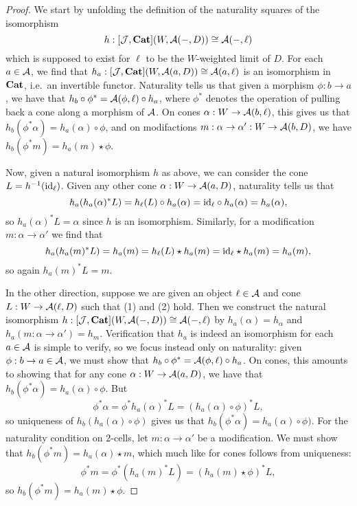 \documentclass[../thesis.tex]{subfiles}
\begin{document}
\begin{proof}
  We start by unfolding the definition of the naturality squares of the isomorphism
  \[h : [{\mathcal{J}},{\mathbf{Cat}}](W,{\mathcal{A}}(-,D)) \cong {\mathcal{A}}(-,\ell)\]
  which is supposed to exist for $\ell$ to be the $W$-weighted limit of $D$. For each $a \in {\mathcal{A}}$, we find that
  $h_a : [{\mathcal{J}},{\mathbf{Cat}}](W,{\mathcal{A}}(a,D)) \cong {\mathcal{A}}(a,\ell)$ is an isomorphism in ${\mathbf{Cat}}$, i.e.\ an invertible functor.
  Naturality tells us that given a morphism $\phi : b \to a$, we have that $h_b \circ \phi^* = {\mathcal{A}}(\phi,\ell)
  \circ h_a$, where $\phi^*$ denotes the operation of pulling back a cone along a morphism of ${\mathcal{A}}$. On cones
  $\alpha : W \to {\mathcal{A}}(b,\ell)$, this gives us that $h_b(\phi^*\alpha) = h_a(\alpha) \circ \phi$, and on
  modifactions $m : \alpha \to \alpha' : W \to {\mathcal{A}}(b,D)$, we have $h_b(\phi^*m) = h_a(m) \star \phi$.

  Now, given a natural isomorphism $h$ as above, we can consider the cone $L = h^{-1}({\mathrm{id}}_\ell)$. Given any
  other cone $\alpha : W \to {\mathcal{A}}(a,D)$, naturality tells us that
  \[h_a(h_a(\alpha)^*L) = h_\ell(L) \circ h_a(\alpha) = {\mathrm{id}}_\ell \circ h_a(\alpha) = h_a(\alpha),\]
  so $h_a(\alpha)^*L = \alpha$ since $h$ is an isomorphism. Similarly, for a modification $m : \alpha \to
  \alpha'$ we find that
  \[h_a(h_a(m)^*L) = h_a(m) = h_\ell(L) \star h_a(m) = {\mathrm{id}}_\ell \star h_a(m) = h_a(m),\]
  so again $h_a(m)^*L = m$.


  In the other direction, suppose we are given an object $\ell \in {\mathcal{A}}$ and cone $L : W \to {\mathcal{A}}(\ell,D)$
  such that (1) and (2) hold. Then we construct the natural isomorphism $h : [{\mathcal{J}},{\mathbf{Cat}}](W,{\mathcal{A}}(-,D)) \cong
  {\mathcal{A}}(-,\ell)$ by $h_a(\alpha) = h_\alpha$ and $h_a(m : \alpha \to \alpha') = h_m$. Verification that $h_a$
  is indeed an isomorphism for each $a \in {\mathcal{A}}$ is simple to verify, so we focus instead only on naturality:
  given $\phi : b \to a \in {\mathcal{A}}$, we must show that $h_b \circ \phi^* = {\mathcal{A}}(\phi,\ell) \circ h_a$. On cones,
  this amounts to showing that for any cone $\alpha : W \to {\mathcal{A}}(a,D)$, we have that $h_b(\phi^*\alpha) =
  h_a(\alpha) \circ \phi$. But
  \[
    \phi^*\alpha = \phi^*h_a(\alpha)^*L = (h_a(\alpha) \circ \phi)^*L,
  \]
  so uniqueness of $h_b(h_a(\alpha) \circ \phi)$ gives us that $h_b(\phi^*\alpha) = h_a(\alpha) \circ \phi)$.
  For the naturality condition on 2-cells, let $m : \alpha \to \alpha'$ be a modification. We must show that
  $h_b(\phi^*m) = h_a(\alpha) \star m$, which much like for cones follows from uniqueness:
  \[\phi^*m = \phi^*(h_a(m)^*L) = (h_a(m)\star\phi)^*L,\]
  so $h_b(\phi^*m) = h_a(m)\star\phi$.
\end{proof}
\end{document}
